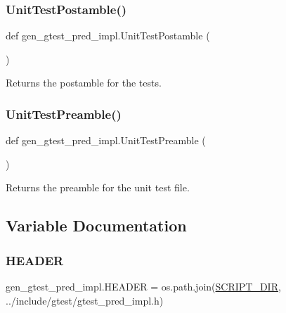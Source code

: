 \subsubsection{\texorpdfstring{UnitTestPostamble()}{UnitTestPostamble()}}
{\footnotesize\ttfamily def gen\+\_\+gtest\+\_\+pred\+\_\+impl.\+Unit\+Test\+Postamble (\begin{DoxyParamCaption}{ }\end{DoxyParamCaption})}

\begin{DoxyVerb}Returns the postamble for the tests.\end{DoxyVerb}
 \mbox{\label{namespacegen__gtest__pred__impl_ae52dc86461d1b666c7b658a8c27c69f9}} 
\subsubsection{\texorpdfstring{UnitTestPreamble()}{UnitTestPreamble()}}
{\footnotesize\ttfamily def gen\+\_\+gtest\+\_\+pred\+\_\+impl.\+Unit\+Test\+Preamble (\begin{DoxyParamCaption}{ }\end{DoxyParamCaption})}

\begin{DoxyVerb}Returns the preamble for the unit test file.\end{DoxyVerb}
 

\subsection{Variable Documentation}
\mbox{\label{namespacegen__gtest__pred__impl_ab96c63705e2cb7619876ba592dab4c8e}} 
\subsubsection{\texorpdfstring{HEADER}{HEADER}}
{\footnotesize\ttfamily gen\+\_\+gtest\+\_\+pred\+\_\+impl.\+H\+E\+A\+D\+ER = os.\+path.\+join(\mbox{\hyperlink{namespacegen__gtest__pred__impl_aed087c7fc787a064f0a9fd5f5f9f6487}{S\+C\+R\+I\+P\+T\+\_\+\+D\+IR}}, \textquotesingle{}../include/gtest/gtest\+\_\+pred\+\_\+impl.\+h\textquotesingle{})}

